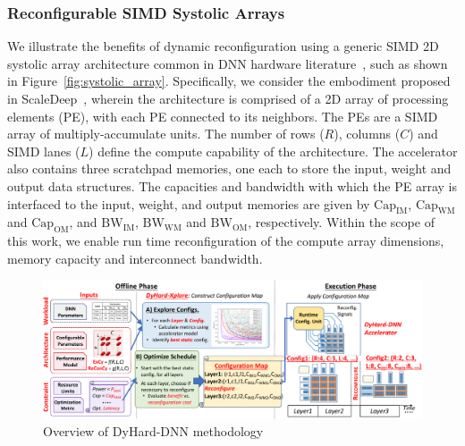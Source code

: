 \subsubsection{Reconfigurable SIMD Systolic Arrays} 
\label{sec:syst-array}

We illustrate the benefits of dynamic reconfiguration using a generic SIMD 2D systolic array architecture common in DNN hardware literature~\cite{venkataramani2017scaledeep,chen2017eyeriss,chen2014dadiannao}, such as shown in Figure~\ref{fig:systolic_array}. 
Specifically, we consider the embodiment proposed in ScaleDeep~\cite{venkataramani2017scaledeep}, wherein the architecture is comprised of a 2D array of processing elements (PE), with each PE connected to its neighbors.
The PEs are a SIMD array of multiply-accumulate units.
The number of rows ($R$), columns ($C$) and SIMD lanes ($L$) define the compute capability of the architecture.
The accelerator also contains three scratchpad memories, one each to store the input, weight and output data structures.
The capacities and bandwidth with which the PE array is interfaced to the input, weight, and output memories are given by $\textrm{Cap}_\textrm{IM}$, $\textrm{Cap}_\textrm{WM}$ and $\textrm{Cap}_\textrm{OM}$, and $\textrm{BW}_\textrm{IM}$, $\textrm{BW}_\textrm{WM}$ and $\textrm{BW}_\textrm{OM}$, respectively.
Within the scope of this work, we enable run time reconfiguration of the compute array dimensions, memory capacity and interconnect bandwidth.


\begin{figure}
    \centering
    \includegraphics[width=\linewidth]{figs/dyHard-dnn-overview.pdf}
    \caption{Overview of DyHard-DNN methodology}
    \label{fig:overview}
\end{figure}

